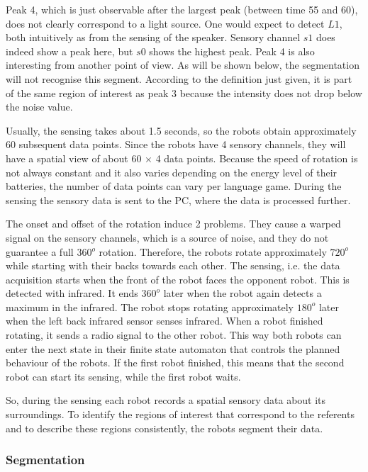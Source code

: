 Peak 4, which is just observable after the largest peak (between time 55 and 60), does not clearly correspond to a light source. One would expect to detect $L1$, both intuitively as from the sensing of the speaker. Sensory channel $s1$ does indeed show a peak here, but $s0$ shows the highest peak. Peak 4 is also interesting from another point of view. As will be shown below, the segmentation will not recognise this segment. According to the definition just given, it is part of the same region of interest as peak 3 because the intensity does not drop below the noise value.


Usually, the sensing takes about 1.5 seconds, so the robots obtain approximately 60 subsequent data points. Since the robots have 4 sensory channels, they will have a spatial view of about 60 $\times$ 4 data points. Because the speed of rotation is not always constant and it also varies depending on the energy level of their batteries, the number of data points can vary per language game. During the sensing the sensory data is sent to the PC, where the data is processed further.

The onset and offset of the rotation induce 2 problems. They cause a warped signal on the sensory channels, which is a source of noise, and they do not guarantee a full 360$^o$ rotation. Therefore, the robots rotate approximately $720^o$ while starting with their backs towards each other. The sensing, i.e. the data acquisition starts when the front of the robot faces the opponent robot. This is detected with infrared. It ends $360^o$ later when the robot again detects a maximum in the infrared. The robot stops rotating approximately $180^o$ later when the left back infrared sensor senses infrared. When a robot finished rotating, it sends a radio signal to the other robot. This way both robots can enter the next state in their finite state automaton that controls the planned behaviour of the robots. If the first robot finished, this means that the second robot can start its sensing, while the first robot waits.

So, during the sensing each robot records a spatial sensory data about its surroundings. To identify the regions of interest that correspond to the referents and to describe these regions consistently, the robots segment their data.


\subsubsection{Segmentation}


